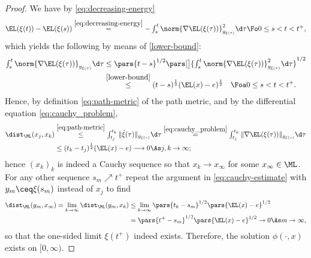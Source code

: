 \begin{proof}
We have by \cref{eq:decreasing-energy} 
\begin{align}
	\EL(\xi(t))-\EL(\xi(s))\overset{\cref{eq:decreasing-energy}}{=}
	\textstyle
	-\int_s^t \norm{ \nabla \EL(\xi(\tau))}^2_{g_{\xi(\tau)}}\d \tau
	\Fo 0\le s< t<t^+,\label{eq:energy-identity}
\end{align}
which yields the following by means of \ref{lower-bound}:
\begin{align*}
\textstyle
\int_{s}^{t} \norm{\nabla \EL(\xi(\tau))}_{g_{\xi(\tau)}}
\d \tau 
&\textstyle
	\le 
	\pars{t-s}^{1/2} 
	\pars[\big]{ \int_s^t
		\norm{\nabla \EL(\xi(\tau))}^2_{g_{\xi(\tau)}}\d \tau 
	}^{1/2}\\
&\overset{\ref{lower-bound}}{\le}(t-s)^{\frac{1}{2}}(\EL(x)-e)^{\frac{1}{2}}
\quad\Foa 0\le s<t<t^+.
	\end{align*}
	Hence, by definition \cref{eq:path-metric} of the path metric,
	and by the differential equation \cref{eq:cauchy_problem},
	\begin{align}
		\dist_\ML(x_j,x_k)&\overset{\cref{eq:path-metric}}{\le}
		\textstyle
		\int_{t_j}^{t_k}\|\dot{\xi}(\tau)\|_{g_{\xi(\tau)}}\d
		\tau \overset{\cref{eq:cauchy_problem}}{=}
		\int_{t_j}^{t_k}\|\nabla \EL(\xi(\tau)) \|_{g_{\xi(\tau)}}
		\d 
		\tau\notag\\
		&\le (t_k-t_j)^{\frac{1}{2}}(\EL(x)-e)
		\longrightarrow 0 \As j,k\to\infty;\label{eq:cauchy-estimate}
	\end{align}
hence $(x_k)_k$ is indeed a Cauchy sequence so that $x_k\to x_\infty$
for some $x_\infty\in\ML$. For any other sequence $s_m\nearrow t^+$ repeat
the argument in \cref{eq:cauchy-estimate} with $y_m \ceq \xi(s_m)$ instead of
$x_j$ to find
\begin{align*}
	\dist_\ML(y_m,x_\infty)
	=
	\lim_{k\to\infty} \dist_\ML(y_m,x_k)
	&\le
	\lim_{k\to\infty} \pars{t_k-s_m}^{1/2} \pars{\EL(x)-e}^{1/2}
	\\
	& = 
	\pars{t^+-s_m}^{1/2} \pars{\EL(x)-e}^{1/2}
	\to 
	0
	\As m\to\infty,
\end{align*}
so that the one-sided limit $\xi(t^+)$ indeed exists.
Therefore, 
	the solution $\phi(\cdot,x)$ exists on $[0,\infty)$.


\end{proof}
